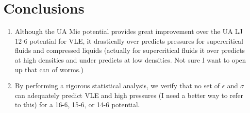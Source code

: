 \documentclass[preprint,letterpaper,floatfix,citeautoscript,aip,jcp]{revtex4-1}
\begin{document}
\section{Conclusions}

\begin{enumerate}
	\item Although the UA Mie potential provides great improvement over the UA LJ 12-6 potential for VLE, it drastically over predicts pressures for supercritical fluids and compressed liquids (actually for supercritical fluids it over predicts at high densities and under predicts at low densities. Not sure I want to open up that can of worms.)
	\item By performing a rigorous statistical analysis, we verify that no set of $\epsilon$ and $\sigma$ can adequately predict VLE and high pressures (I need a better way to refer to this) for a 16-6, 15-6, or 14-6 potential.
\end{enumerate}


\end{document}
